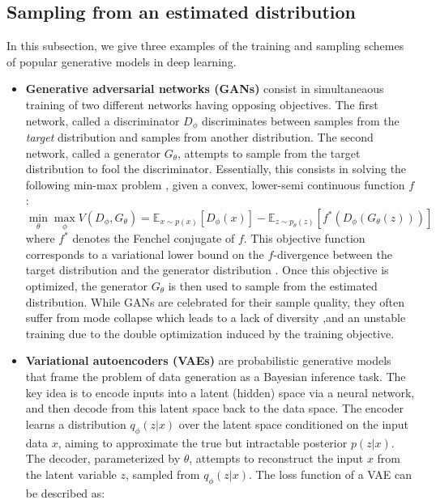 \subsection{Sampling from an estimated distribution}
In this subsection, we give three examples of the training and sampling schemes of popular generative models in deep learning.
\begin{itemize}
    \item \textbf{Generative adversarial networks (GANs)} \citep{goodfellow2014generativeadversarialnetworks} consist in simultaneaous training of two different networks having opposing objectives. The first network, called a discriminator $D_{\phi}$ discriminates between samples from the \textit{target} distribution and samples from another distribution. The second network, called a generator $G_{\theta}$, attempts to sample from the target distribution to fool the discriminator. Essentially, this consists in solving the following min-max problem \citep{nowozin2016fgantraininggenerativeneural}, given a convex, lower-semi continuous function $f$:
    \begin{equation}\label{eq:f_gan}
        \min_{\theta} \max_{\phi} V(D_{\phi}, G_{\theta}) = \mathbb{E}_{x \sim p(x)}[D_{\phi}(x)] - \mathbb{E}_{z \sim p_{\theta}(z)}[f^*(D_{\phi}(G_{\theta}(z)))]
    \end{equation}
    where $f^*$ denotes the Fenchel conjugate of $f$. This objective function corresponds to a variational lower bound on the $f$-divergence between the target distribution and the generator distribution \citep{Nguyen_2010}. Once this objective is optimized, the generator $G_{\theta}$ is then used to sample from the estimated distribution. While GANs are celebrated for their sample quality, they often suffer from mode collapse which leads to a lack of diversity \citep{10.1145/3283254.3283282},and an unstable training due to the double optimization induced by the training objective.
    \item \textbf{Variational autoencoders (VAEs)} \citep{kingma2022autoencodingvariationalbayes} are probabilistic generative models that frame the problem of data generation as a Bayesian inference task. The key idea is to encode inputs into a latent (hidden) space via a neural network, and then decode from this latent space back to the data space. The encoder learns a distribution $q_{\phi}(z|x)$ over the latent space conditioned on the input data $x$, aiming to approximate the true but intractable posterior $p(z|x)$. The decoder, parameterized by $\theta$, attempts to reconstruct the input $x$ from the latent variable $z$, sampled from $q_{\phi}(z|x)$. The loss function of a VAE can be described as:

\end{itemize}
